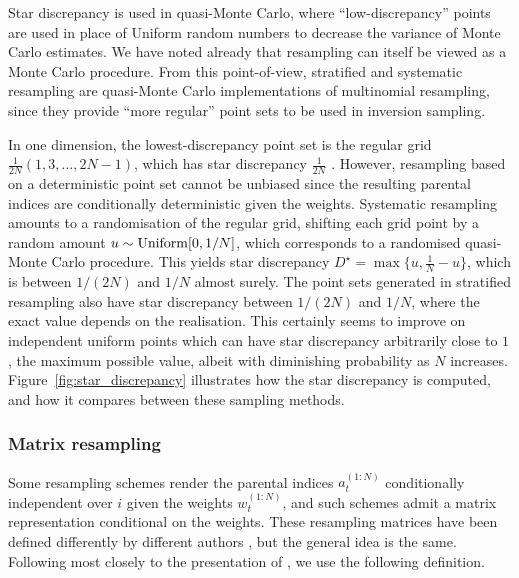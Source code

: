 Star discrepancy is used in quasi-Monte Carlo, where ``low-discrepancy'' points are used in place of Uniform random numbers to decrease the variance of Monte Carlo estimates.
We have noted already that resampling can itself be viewed as a Monte Carlo procedure.
From this point-of-view, stratified and systematic resampling are quasi-Monte Carlo implementations of multinomial resampling, since they provide ``more regular'' point sets to be used in inversion sampling.

In one dimension, the lowest-discrepancy point set is the regular grid $\frac{1}{2N}(1, 3, \dots, 2N-1)$, which has star discrepancy $\frac{1}{2N}$ \parencite[see for example][Corollary 1.2]{kuipers1974}.
However, resampling based on a deterministic point set cannot be unbiased since the resulting parental indices are conditionally deterministic given the weights.
Systematic resampling amounts to a randomisation of the regular grid, shifting each grid point by a random amount $u \sim \operatorname{Uniform}[0,1/N]$, which corresponds to a randomised quasi-Monte Carlo procedure. This yields star discrepancy $D^\star = \max\{u, \frac{1}{N} -u\}$, which is between $1/(2N)$ and $1/N$ almost surely.
The point sets generated in stratified resampling also have star discrepancy between $1/(2N)$ and $1/N$, where the exact value depends on the realisation.
This certainly seems to improve on independent uniform points which can have star discrepancy arbitrarily close to $1$, the maximum possible value, albeit with diminishing probability as $N$ increases.
Figure~\ref{fig:star_discrepancy} illustrates how the star discrepancy is computed, and how it compares between these sampling methods.



\subsubsection{Matrix resampling}
Some resampling schemes render the parental indices $a_t^{(1:N)}$ conditionally independent over $i$ given the weights $w_t^{(1:N)}$, and such schemes admit a matrix representation conditional on the weights.
These resampling matrices have been defined differently by different authors \parencite[cf.][]{webber2019, whiteley2016}, but the general idea is the same. Following most closely to the presentation of \textcite{li2020}, we use the following definition.

